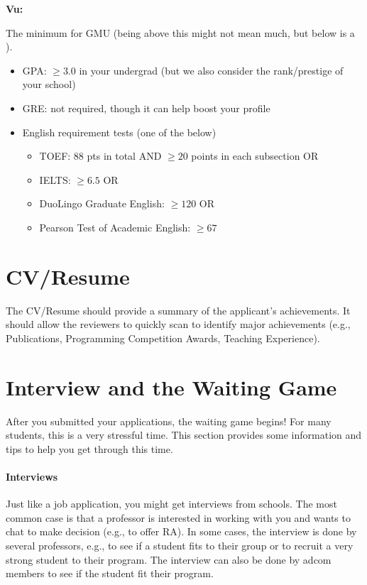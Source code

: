 \documentclass[oneside,11pt]{memoir}
\newenvironment{commentbox}[1][]{
  \small
  \begin{mybox}
    {\small \textbf{#1}}
  }{
  \end{mybox}
}
\newcommand{\red}[1]{{\color{red}{#1}}}
\begin{document}
\begin{commentbox}[Vu:]
  The minimum for GMU (being above this might not mean much, but below is a \red{red flag}).
  \begin{itemize}
    \item GPA: $\ge 3.0$ in your undergrad (but we also consider the rank/prestige of your school)
    \item GRE: not required, though it can help boost your profile
    \item English requirement tests (one of the below)
          \begin{itemize}
            \item TOEF: 88 pts in total AND $\ge 20$ points in each subsection OR
            \item IELTS: $\ge 6.5$ OR
            \item DuoLingo Graduate English: $\ge 120$ OR
            \item Pearson Test of Academic English: $\ge 67$
          \end{itemize}
  \end{itemize}
\end{commentbox}


\section{CV/Resume}
The CV/Resume should provide a summary of the applicant's achievements.  It should allow the reviewers to quickly scan to identify major achievements (e.g., Publications, Programming Competition Awards, Teaching Experience).

\section{Interview and the Waiting Game}\label{sec:interview}

After you submitted your applications, the waiting game begins! For many students, this is a very stressful time. This section provides some information and tips to help you get through this time.

\paragraph{Interviews} Just like a job application, you might get interviews from schools. The most common case is that a professor is interested in working with you and wants to chat to make decision (e.g., to offer RA). In some cases, the interview is done by several professors, e.g., to see if a student fits to their group or to recruit a very strong student to their program. The interview can also be done by adcom members to see if the student fit their program.
\end{document}
